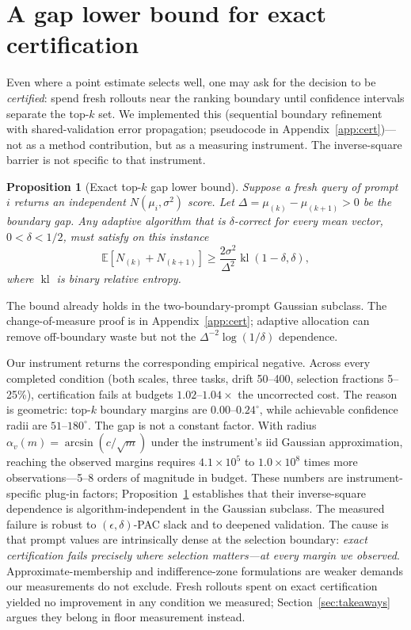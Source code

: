 \documentclass[11pt]{article}
\newtheorem{proposition}{Proposition}
\begin{document}
\section{A gap lower bound for exact certification}
\label{sec:cert}

Even where a point estimate selects well, one may ask for the decision to be
\emph{certified}: spend fresh rollouts near the ranking boundary until
confidence intervals separate the top-$k$ set. We implemented this
(sequential boundary refinement with shared-validation error propagation;
pseudocode in Appendix~\ref{app:cert})---not as a method contribution, but
as a measuring instrument. The inverse-square barrier is not specific to
that instrument.

\begin{proposition}[Exact top-$k$ gap lower bound]
\label{prop:certlb}
Suppose a fresh query of prompt $i$ returns an independent
$N(\mu_i,\sigma^2)$ score. Let
$\Delta=\mu_{(k)}-\mu_{(k+1)}>0$ be the boundary gap. Any adaptive algorithm
that is $\delta$-correct for every mean vector, $0<\delta<1/2$, must satisfy
on this instance
\[
\mathbb E[N_{(k)}+N_{(k+1)}]
\ge \frac{2\sigma^2}{\Delta^2}
\operatorname{kl}(1-\delta,\delta),
\]
where $\operatorname{kl}$ is binary relative entropy.
\end{proposition}

The bound already holds in the two-boundary-prompt Gaussian subclass. The
change-of-measure proof is in Appendix~\ref{app:cert}; adaptive allocation can
remove off-boundary waste but not the $\Delta^{-2}\log(1/\delta)$ dependence.

Our instrument returns the corresponding empirical negative.
Across every completed condition (both scales, three tasks, drift 50--400,
selection fractions 5--25\%), certification fails at budgets
$1.02$--$1.04\times$ the uncorrected cost. The reason is geometric: top-$k$
boundary margins are $0.00$--$0.24^\circ$, while achievable confidence radii
are $51$--$180^\circ$. The gap is not a constant factor. With radius
$\alpha_v(m)=\arcsin(c/\sqrt m)$ under the instrument's iid Gaussian
approximation, reaching the observed margins requires
$4.1{\times}10^{5}$ to $1.0{\times}10^{8}$ times more observations---5--8
orders of magnitude in budget. These numbers are instrument-specific
plug-in factors; Proposition~\ref{prop:certlb} establishes that their
inverse-square dependence is algorithm-independent in the Gaussian subclass.
The measured failure is robust to
$(\epsilon,\delta)$-PAC slack and to deepened validation. The cause is that
prompt values are intrinsically dense at the selection boundary:
\emph{exact certification fails precisely where selection matters---at
every margin we observed}. Approximate-membership and indifference-zone
formulations are weaker demands our measurements do not exclude. Fresh
rollouts spent on exact certification yielded no improvement in any condition we
measured; Section~\ref{sec:takeaways} argues they belong in floor measurement
instead.
\end{document}
